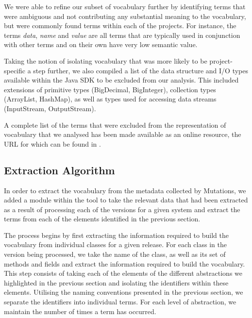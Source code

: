 We were able to refine our subset of vocabulary further by identifying terms that were ambiguous and not contributing any substantial meaning to the vocabulary, but were commonly found terms within each of the projects. For instance, the terms \emph{data}, \emph{name} and \emph{value} are all terms that are typically used in conjunction with other terms and on their own have very low semantic value.

Taking the notion of isolating vocabulary that was more likely to be project-specific a step further, we also compiled a list of the data structure and I/O types available within the Java SDK to be excluded from our analysis. This included extensions of primitive types (\eg BigDecimal, BigInteger), collection types (\eg ArrayList, HashMap), as well as types used for accessing data streams (\eg InputStream, OutputStream).

A complete list of the terms that were excluded from the representation of vocabulary that we analysed has been made available as an online resource, the URL for which can be found in .



\subsection{Extraction Algorithm} %
\label{sub:extraction_algorithm}

In order to extract the vocabulary from the metadata collected by Mutations, we added a module within the tool to take the relevant data that had been extracted as a result of processing each of the versions for a given system and extract the terms from each of the elements identified in the previous section.

The process begins by first extracting the information required to build the vocabulary from individual classes for a given release. For each class in the version being processed, we take the name of the class, as well as its set of methods and fields and extract the information required to build the vocabulary. This step consists of taking each of the elements of the different abstractions we highlighted in the previous section and isolating the identifiers within these elements. Utilising the naming conventions presented in the previous section, we separate the identifiers into individual terms. For each level of abstraction, we maintain the number of times a term has occurred.

